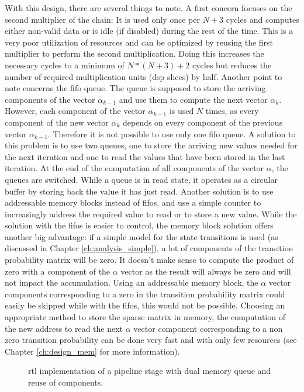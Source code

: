 \documentclass[mscthesis]{usiinfthesis}
\begin{document}
With this design, there are several things to note. A first concern focuses on
the second multiplier of the chain: It is used only once per $N+3$ cycles
and computes either non-valid data or is idle (if disabled) during the rest of
the time. This is a very poor utilization of resources and can be optimized by
reusing the first multiplier to perform the second multiplication. Doing this
increases the necessary cycles to a minimum of $N*(N+3)+2$ cycles but reduces
the number of required multiplication units (\gls{dsp} slices) by half. Another
point to note concerns the \gls{fifo} queue. The queue is supposed to store the
arriving components of the vector $\alpha_{k-1}$ and use them to compute the
next vector $\alpha_k$. However, each component of the vector $\alpha_{k-1}$ is
used $N$ times, as every component of the new vector $\alpha_k$ depends on
every component of the previous vector $\alpha_{k-1}$. Therefore it is not
possible to use only one \gls{fifo} queue. A solution to this problem is to use
two queues, one to store the arriving new values needed for the next iteration
and one to read the values that have been stored in the last iteration. At the
end of the computation of all components of the vector $\alpha$, the queues are
switched. While a queue is in read state, it operates as a circular buffer by
storing back the value it has just read. Another solution is to use addressable
memory blocks instead of \glspl{fifo}, and use a simple counter to increasingly
address the required value to read or to store a new value. While the solution
with the \glspl{fifo} is easier to control, the memory block solution offers
another big advantage: if a simple model for the state transitions is used (as
discussed in Chapter \ref{ch:analysis_simple}), a lot of components of the
transition probability matrix will be zero. It doesn't make sense to compute
the product of zero with a component of the $\alpha$ vector as the result will
always be zero and will not impact the accumulation. Using an addressable memory
block, the $\alpha$ vector components corresponding to a zero in the transition
probability matrix could easily be skipped while with the \glspl{fifo}, this
would not be possible. Choosing an appropriate method to store the sparse
matrix in memory, the computation of the new address to read the next $\alpha$
vector component corresponding to a non zero transition probability can be done
very fast and with only few resources (see Chapter \ref{ch:design_mem} for more
information).

\begin{figure}
    \centering
    
    \caption{\acrshort{rtl} implementation of a pipeline stage with dual memory
        queue and reuse of components.}
    \label{fig:arch_step}
\end{figure}
\end{document}
